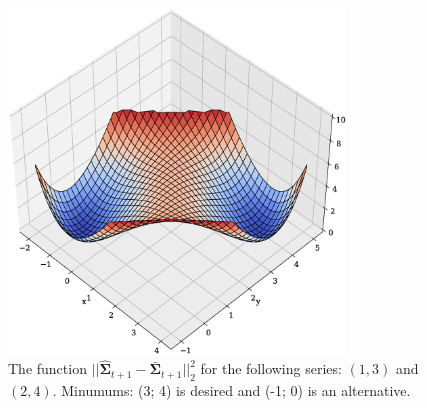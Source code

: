 \documentclass[12pt]{article}
\begin{document}
\begin{figure}[!htbp]
	\centering
	\begin{center}
		\includegraphics[width=0.8\textwidth]{NonConvex.eps}
	\end{center}
	\caption{The function $||\hat{\mathbf{\Sigma}}_{t+1} - \bar{\mathbf{\Sigma}}_{t+1}||_2^2$ for the following series: $(1, 3)$ and $(2, 4)$. Minumums: (3; 4) is desired and (-1; 0) is an alternative.}
	\label{fig:fig2}
\end{figure}
\end{document}
